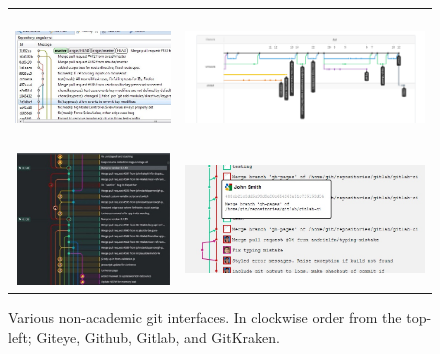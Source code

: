 \begin{figure}[htpb]
  \centering
  \begin{tabular}{cc}
    \includegraphics[height=3.5cm]{Figures/introduction/giteye_graph.jpg}
    &
    \includegraphics[height=3.5cm]{Figures/introduction/github_dag.png}
    \\

    \includegraphics[height=3.5cm]{Figures/introduction/gitkraken_graph.jpg}
    &
    \includegraphics[height=3.5cm]{Figures/introduction/gitlab_graph.jpg}
  \end{tabular}

  \caption{Various non-academic git interfaces. In clockwise order from the
    top-left; Giteye, Github, Gitlab, and GitKraken.}
  \label{fig:non_academic_work}
\end{figure}
